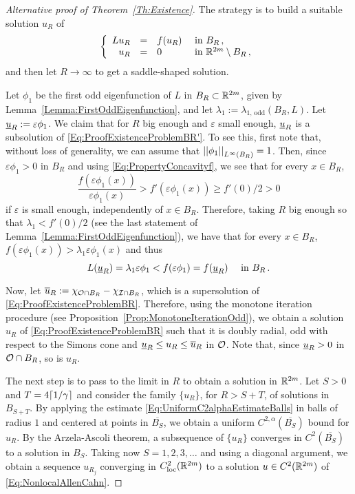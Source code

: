 \begin{proof}[Alternative proof of Theorem~\ref{Th:Existence}]
The strategy is to build a suitable solution $u_R$ of 
\begin{equation}
\label{Eq:ProofExistenceProblemBR'}
	\left\{\begin{array}{rcll}
	L u_R &=& f(u_R) & \textrm{ in } B_R\,,\\
	u_R &=& 0 & \textrm{ in }\mathbb{R}^{2m} \setminus B_R\,,
	\end{array} \right.
\end{equation}
and then let $R\to \infty$ to get a saddle-shaped solution.

Let $\phi_1$ be the first odd eigenfunction of $L$ in $B_R \subset \mathbb{R}^{2m}$, given by Lemma~\ref{Lemma:FirstOddEigenfunction}, and let  $\lambda_1 := \lambda_{1, \, \mathrm{odd}}(B_R, L)$. Let $\underline{u}_R := \varepsilon \phi_1$. We claim that for $R$ big enough and $\varepsilon$ small enough, $\underline{u}_R$ is a subsolution of \eqref{Eq:ProofExistenceProblemBR'}. To see this, first note that, without loss of generality, we can assume that $\left | \left |{\phi_1} \right | \right |_{L^\infty(B_R)}=1$. Then, since $\varepsilon \phi_1>0$ in $B_R$ and using \eqref{Eq:PropertyConcavityf}, we see that for every $x\in B_R$,
$$
\dfrac{f(\varepsilon \phi_1(x))}{\varepsilon \phi_1(x)} > f'(\varepsilon \phi_1(x)) \geq f'(0)/2 > 0
$$
if $\varepsilon$ is small enough, independently of $x\in B_R$. Therefore, taking $R$ big enough so that $\lambda_1 < f'(0)/2$ (see the last statement of Lemma~\ref{Lemma:FirstOddEigenfunction}), we have that for every $x\in B_R$,  $f(\varepsilon \phi_1(x)) > \lambda_1 \varepsilon \phi_1(x)$ and thus
$$
L(\underline{u}_R) = \lambda_1 \varepsilon \phi_1 < f(\varepsilon \phi_1) = f(\underline{u}_R) \quad \textrm{ in } B_R\,.
$$

Now, let $\overline{u}_R := \chi_{\mathcal{O} \cap B_R} - \chi_{\mathcal{I} \cap B_R}$, which is a supersolution of \eqref{Eq:ProofExistenceProblemBR}. Therefore, using the monotone iteration procedure (see Proposition~\ref{Prop:MonotoneIterationOdd}), we obtain a solution $u_R$ of \eqref{Eq:ProofExistenceProblemBR} such that it is doubly radial, odd with respect to the Simons cone and $\underline{u}_R \leq u_R \leq \overline{u}_R$ in $\mathcal{O}$. Note that, since $\underline{u}_R > 0$ in $\mathcal{O} \cap B_R$, so is $u_R$.

The next step is to pass to the limit in $R$ to obtain a solution in $\mathbb{R}^{2m}$. Let $S>0$ and $T =4\lceil 1/\gamma\rceil$ and consider the family $\{u_R\}$, for $R> S + T$, of solutions in $B_{S+T}$. By applying the estimate \eqref{Eq:UniformC2alphaEstimateBalls} in balls of radius $1$ and centered at points in $\overline{B_{S}}$, we obtain a uniform $C^{2,\alpha}(\overline{B_S})$ bound for $u_R$. By the Arzela-Ascoli theorem, a subsequence of $\{u_R\}$ converges in $C^2(\overline{B_S})$ to a solution in $B_S$. Taking now $S = 1,2,3,\ldots$ and using a diagonal argument, we obtain a sequence $u_{R_j}$ converging in $C^2_{\mathrm{loc}}(\mathbb{R}^{2m})$ to a solution $u \in C^2(\mathbb{R}^{2m})$ of \eqref{Eq:NonlocalAllenCahn}.


\end{proof}
